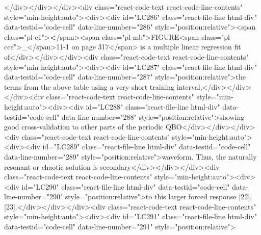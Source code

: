 {{</div></div></div><div class="react-code-text react-code-line-contents" style="min-height:auto"><div><div id="LC286" class="react-file-line html-div" data-testid="code-cell" data-line-number="286" style="position:relative"><span class="pl-c1">\textbf</span>{<span class="pl-mb">FIGURE<span class="pl-cce">\_</span>11-1 on page 317</span>} is a multiple linear regression fit of</div></div></div><div class="react-code-text react-code-line-contents" style="min-height:auto"><div><div id="LC287" class="react-file-line html-div" data-testid="code-cell" data-line-number="287" style="position:relative">the terms from the above table using a very short training interval,</div></div></div><div class="react-code-text react-code-line-contents" style="min-height:auto"><div><div id="LC288" class="react-file-line html-div" data-testid="code-cell" data-line-number="288" style="position:relative">showing good cross-validation to other parts of the periodic QBO</div></div></div><div class="react-code-text react-code-line-contents" style="min-height:auto"><div><div id="LC289" class="react-file-line html-div" data-testid="code-cell" data-line-number="289" style="position:relative">waveform. Thus, the naturally resonant or chaotic solution is secondary</div></div></div><div class="react-code-text react-code-line-contents" style="min-height:auto"><div><div id="LC290" class="react-file-line html-div" data-testid="code-cell" data-line-number="290" style="position:relative">to this larger forced response {[}22{]}, {[}23{]}.</div></div></div><div class="react-code-text react-code-line-contents" style="min-height:auto"><div><div id="LC291" class="react-file-line html-div" data-testid="code-cell" data-line-number="291" style="position:relative">
}}
